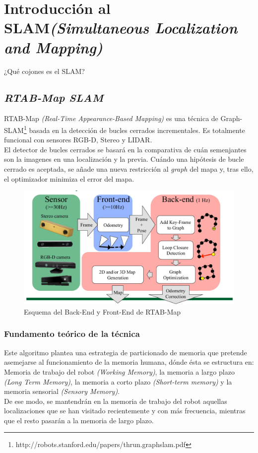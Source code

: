 \section{Introducción al SLAM\textit{(Simultaneous Localization and Mapping)}}
¿Qué cojones es el SLAM?

\subsection{\textit{RTAB-Map SLAM}}
RTAB-Map \textit{(Real-Time Appearance-Based Mapping)} es una técnica de Graph-SLAM\footnote{http://robots.stanford.edu/papers/thrun.graphslam.pdf} basada en la detección de bucles cerrados incrementales. Es totalmente funcional 
con sensores RGB-D, Stereo y LIDAR. \\
El detector de bucles cerrados se basará en la comparativa de cuán semenjantes son la imagenes en una localización y la previa. Cuándo una hipótesis 
de bucle cerrado es aceptada, se añade una nueva restricción al \textit{graph} del mapa y, tras ello, el optimizador minimiza el error del mapa. \\

\begin{figure}[h!]
    \centering
    \includegraphics[width=.7\textwidth]{images/rtabmap_scheme}
    \caption{Esquema del Back-End y Front-End de RTAB-Map}
\end{figure}


\subsubsection{Fundamento teórico de la técnica}
Este algoritmo plantea una estrategia de particionado de memoria que pretende asemejarse al funcionamiento de la memoria humana, 
dónde ésta se estructura en: \\
Memoria de trabajo del robot \textit{(Working Memory)}, la memoria a largo plazo \textit{(Long Term Memory)}, 
la memoria a corto plazo \textit{(Short-term memory)} y la memoria sensorial \textit{(Sensory Memory)}. \\
De ese modo, se mantendrán en la memoria de trabajo del robot aquellas localizaciones que se han visitado recientemente 
y con más frecuencia, mientras que el resto pasarán a la memoria de largo plazo. \\

